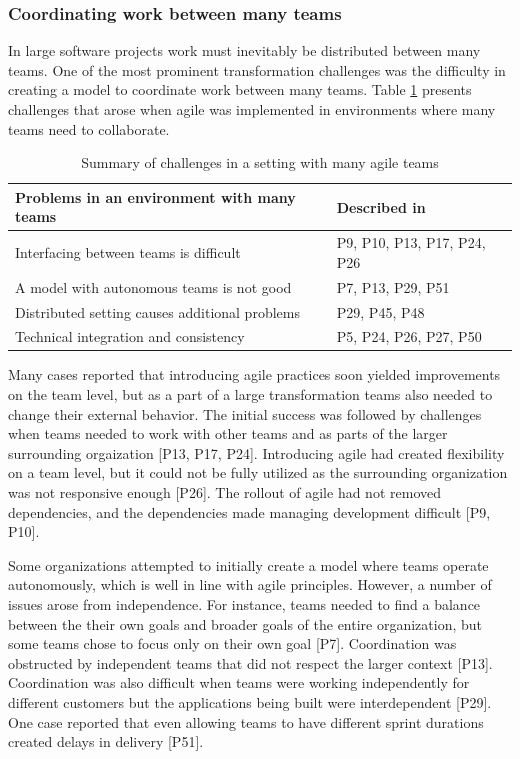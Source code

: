 \documentclass[preprint,authoryear,12pt]{elsarticle}
\begin{document}
\subsubsection{Coordinating work between many teams}

In large software projects work must inevitably be distributed between many
teams. One of the most prominent transformation challenges was the difficulty in
creating a model to coordinate work between many teams. Table
\ref{table:challenges_coordinatingteams} presents challenges that arose when
agile was implemented in environments where many teams need to collaborate.

\begin{table}
    \begin{tabular}{ p{} p{} }
        \toprule
        Problems in an environment with many teams  &  Described in \\
        \midrule
        Interfacing between teams is difficult  & 
        P9, P10, P13, P17, \newline
        P24, P26 \\
        A model with autonomous teams is not good  &  P7, P13, P29, P51  \\
        Distributed setting causes additional problems  &  P29, P45, P48  \\
        Technical integration and consistency  &  P5, P24, P26, P27, P50  \\
        \bottomrule
    \end{tabular}
    \caption{Summary of challenges in a setting with many agile teams}
    \label{table:challenges_coordinatingteams}
\end{table}

Many cases reported that introducing agile practices soon yielded improvements
on the team level, but as a part of a large transformation teams also needed to
change their external behavior.
The initial success was followed by challenges when teams needed to work with
other teams and as parts of the larger surrounding orgaization [P13, P17, P24].
Introducing agile had created flexibility on a team level, but it could not be
fully utilized as the surrounding organization was not responsive enough [P26].
The rollout of agile had not removed dependencies, and the dependencies
made managing development difficult [P9, P10].


Some organizations attempted to initially create a model where teams operate
autonomously, which is well in line with agile principles. However, a number of
issues arose from independence. For instance, teams needed to find a balance
between the their own goals and broader goals of the entire organization, but
some teams chose to focus only on their own goal [P7]. Coordination was
obstructed by independent teams that did not respect the larger context [P13].
Coordination was also difficult when teams were working independently for
different customers but the applications being built were interdependent [P29].
One case reported that even allowing teams to have different sprint durations
created delays in delivery [P51].
\end{document}
